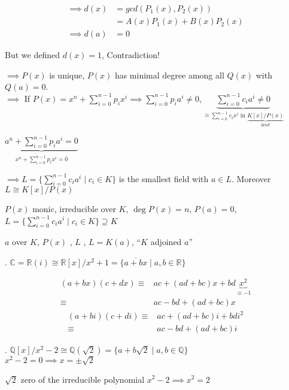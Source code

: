\begin{align*}
  \implies d(x) &= gcd(P_1(x), P_2(x))\\
                &= A(x) P_1(x) + B(x) P_2(x) \\
  \implies d(a) &= 0
\end{align*}

But we defined $d(x) = 1$, Contradiction!

$\implies P(x)$ is unique, $P(x)$ has minimal degree among all $Q(x)$ with $Q(a) = 0$. \\
$\implies$ If $P(x) = x^n + \sum_{i=0}^{n-1} p_i x^i \implies \sum_{i=0}^{n-1} p_i a^i \neq 0, \underbrace{\sum_{i=0}^{n-1} c_i a^i \neq 0}_{\hat{=} \sum_{i=0}^{n-1} c_i x^i \text{ in } \underbrace{K[x]/P(x)}_{\text{field!}}}$

$\underbrace{a^n + \sum_{i=0}^{n-1} p_i a^i = 0}_{\overline{x^n + \sum_{i=0}^{n-1} p_i x^i} = \bar{0}}$

$\implies L = \{ \sum_{i=0}^{n-1} c_i a^i \mid c_i \in K\}$ is the smallest field with $a \in L$. Moreover $L \cong K[x]/P(x)$

\begin{definition}
  $P(x)$ monic, irreducible over $K$, $\deg P(x) = n$, $P(a) = 0$,
  $L = \{ \sum_{i=0}^{n-1} c_i a^i\mid c_i \in K \} \supseteq K$

  $a$  over $K$, $P(x)$ , $L$ , $L = K(a)$, ``$K$ adjoined $a$''
\end{definition}

\Example.
$\mathbb{C} = \mathbb{R}(i) \cong \mathbb{R}[x] / x^2 +1 = \{\overline{a+bx} \mid a,b \in \mathbb{R} \}$

\begin{align*}
  (a + bx)(c+dx)
  \equiv & ac + (ad+bc)x + bd \underbrace{x^2}_{\equiv -1} \\
  \equiv & ac - bd + (ad+bc)x
\end{align*}
\begin{align*}
  (a + bi)(c+di)
  \equiv & ac + (ad+bc)i + bd i^2 \\
  \equiv & ac - bd + (ad+bc)i
\end{align*}

\Example.
$\mathbb{Q}[x] / x^2 -2 \cong \mathbb{Q}(\sqrt{2}) = \{ a+b \sqrt{2} \mid a,b \in \mathbb{Q}\}$ \\
$x^2-2 = 0 \implies x = \pm \sqrt{2}$

$\sqrt{2}$ zero of the irreducible polynomial $x^2 -2 \implies x^2 = 2$

